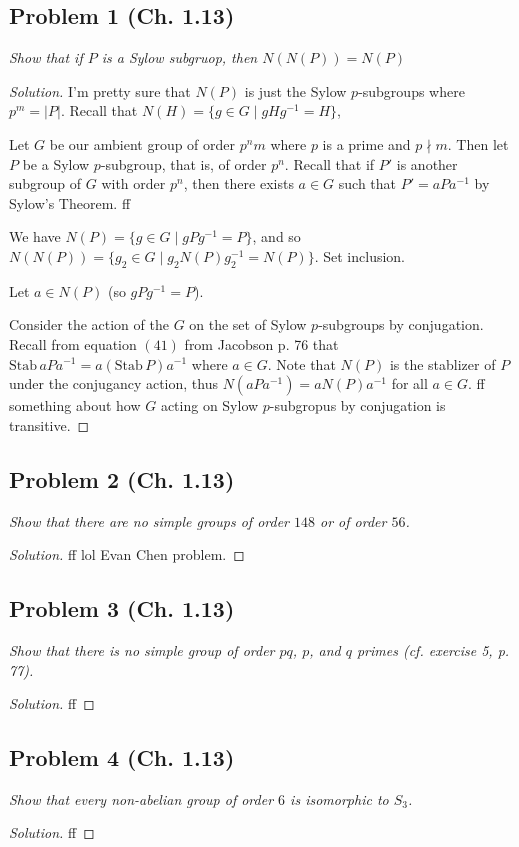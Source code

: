 \documentclass{article}
\begin{document}
\subsection*{Problem 1 (Ch. 1.13)}
{\it Show that if $P$ is a Sylow subgruop, then $N(N(P)) = N(P)$}
\begin{proof}[Solution]\let\qed\relax
	I'm pretty sure that $N(P)$ is just the Sylow $p$-subgroups
	where $p^m = |P|$.
	Recall that $N(H) = \{g \in G \mid gHg^{-1} = H\}$,

	Let $G$ be our ambient group of order $p^nm$ where
	$p$ is a prime and $p \nmid m$.
	Then let $P$ be a Sylow $p$-subgroup, that is,
	of order $p^n$.
	Recall that if $P'$ is another subgroup of $G$ with order $p^n$,
	then there exists $a \in G$ such that $P' = aPa^{-1}$
	by Sylow's Theorem.
	ff

	We have $N(P) = \{g \in G \mid gPg^{-1} = P\}$,
	and so $N(N(P)) = \{g_2 \in G \mid g_2N(P)g_2^{-1} = N(P)\}$.
	Set inclusion.

	Let $a \in N(P)$ (so $gPg^{-1} = P$).
	
	Consider the action of the $G$ on the set of Sylow $p$-subgroups by conjugation.
	Recall from equation $(41)$ from Jacobson p. 76 that
	$\mathrm{Stab} \, aPa^{-1} = a(\mathrm{Stab}\,P)a^{-1}$
	where $a \in G$.
	Note that $N(P)$ is the stablizer of $P$ under the conjugancy action,
	thus $N(aPa^{-1}) = aN(P)a^{-1}$ for all $a \in G$.
	ff something about how $G$ acting on Sylow $p$-subgropus by conjugation is transitive.
\end{proof}

\subsection*{Problem 2 (Ch. 1.13)}
{\it Show that there are no simple groups of order $148$ or of order $56$.}
\begin{proof}[Solution]\let\qed\relax
	ff lol Evan Chen problem.
\end{proof}

\subsection*{Problem 3 (Ch. 1.13)}
{\it Show that there is no simple group of order $pq$,
$p$, and $q$ primes (cf. exercise 5, p. 77).}
\begin{proof}[Solution]\let\qed\relax
	ff
\end{proof}


\subsection*{Problem 4 (Ch. 1.13)}
{\it Show that every non-abelian group of order $6$ is isomorphic to $S_3$.}
\begin{proof}[Solution]\let\qed\relax
	ff
\end{proof}
\end{document}
